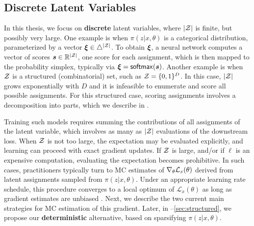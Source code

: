 \subsection{Discrete Latent Variables}\label{sec:discrete_lvm_bg}

In this thesis, we focus on \textbf{discrete} latent variables, where
$|\mathcal{Z}|$ is finite, but possibly very large. One example is when
$\pi(z|x,\theta)$ is a categorical distribution, parameterized by a
vector $\bm{\xi} \in \triangle^{|\mathcal{Z}|}$. To obtain $\bm{\xi}$, a neural network
computes a vector of scores $\bm{s} \in \mathbb{R}^{|\mathcal{Z}|}$, one score
for each assignment, which is then mapped to the probability simplex,
typically via $\bm{\xi} = \operatorname*{\mathsf{softmax}}(\bm{s})$. Another example is when $\mathcal{Z}$ is
a structured (combinatorial) set, such as $\mathcal{Z} = \{0, 1\}^D$. In this
case, $|\mathcal{Z}|$ grows exponentially with $D$ and it is infeasible to
enumerate and score all possible assignments. For this structured
case, scoring assignments involves a decomposition into parts, which
we describe in .

Training such models requires summing the contributions of all
assignments of the latent variable, which involves as many as $|\mathcal{Z}|$
evaluations of the downstream loss. When $\mathcal{Z}$ is not too large, the
expectation may be evaluated explicitly, and learning can proceed
with exact gradient updates. If $\mathcal{Z}$ is large, and/or if $\ell$ is
an expensive computation, evaluating the expectation becomes
prohibitive. In such cases, practitioners typically turn to MC
estimates of $\nabla_\theta \mathcal{L}_x(\theta)$ derived from latent
assignments sampled from $\pi(z|x,\theta)$. Under an appropriate
learning rate schedule, this procedure converges to a local optimum
of $\mathcal L_x(\theta)$ as long as gradient estimates are unbiased
\citep{robbins1951stochastic}. Next, we describe the two current main
strategies for MC estimation of this gradient. Later, in
--\ref{sec:structured}, we propose our
\textbf{deterministic} alternative, based on sparsifying $\pi(z| x,
        \theta)$.

